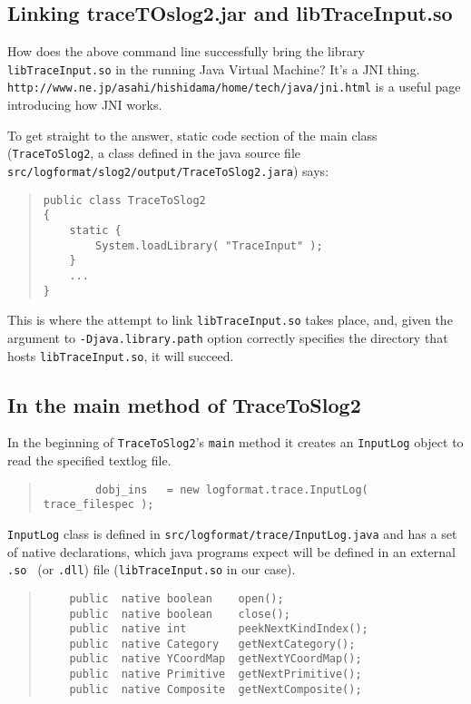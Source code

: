 \documentclass{article}
\begin{document}
\subsection{Linking traceTOslog2.jar and libTraceInput.so}
How does the above command line successfully bring
the library {\tt libTraceInput.so} in the running Java Virtual Machine? 
It's a JNI thing.
{\tt http://www.ne.jp/asahi/hishidama/home/tech/java/jni.html}
is a useful page introducing how JNI works.

To get straight to the answer, static code section of the main class
({\tt TraceToSlog2}, a class defined in the java source file {\tt src/logformat/slog2/output/TraceToSlog2.jara}) says:

\begin{quote}
\begin{verbatim}
public class TraceToSlog2
{
    static {
        System.loadLibrary( "TraceInput" ); 
    }
    ...
}
\end{verbatim}
\end{quote}
This is where the attempt to link {\tt libTraceInput.so} takes place, and,
given the argument to {\tt -Djava.library.path} option correctly specifies
the directory that hosts {\tt libTraceInput.so}, it will succeed.

\subsection{In the main method of TraceToSlog2}
In the beginning of {\tt TraceToSlog2}'s {\tt main} method it creates an {\tt InputLog}
object to read the specified textlog file.

\begin{quote}
\begin{verbatim}
        dobj_ins   = new logformat.trace.InputLog( trace_filespec );
\end{verbatim}
\end{quote}

{\tt InputLog} class is defined in {\tt src/logformat/trace/InputLog.java} and has a set of
native declarations, which java programs expect will be defined in an external {\tt .so } (or {\tt .dll}) file
({\tt libTraceInput.so} in our case).

\begin{quote}
\begin{verbatim}
    public  native boolean    open();
    public  native boolean    close();
    public  native int        peekNextKindIndex();
    public  native Category   getNextCategory();
    public  native YCoordMap  getNextYCoordMap();
    public  native Primitive  getNextPrimitive();
    public  native Composite  getNextComposite();
\end{verbatim}
\end{quote}  
\end{document}
